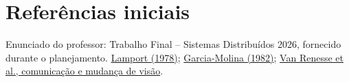 \documentclass[11pt,a4paper]{article}
\begin{document}
\section*{Referências iniciais}
Enunciado do professor: Trabalho Final -- Sistemas Distribuídos 2026,
fornecido durante o planejamento.
\href{https://lamport.azurewebsites.net/pubs/time-clocks.pdf}{Lamport (1978)};
\href{https://homepage.cs.uiowa.edu/~ghosh/Bully.pdf}{Garcia-Molina (1982)};
\href{https://www.cs.cornell.edu/home/rvr/papers/podc/node7.html}{Van Renesse et al.,
comunicação e mudança de visão}.
\end{document}
